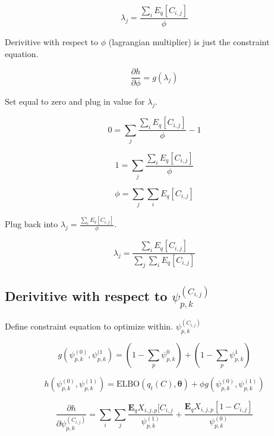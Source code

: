 \documentclass[12pt]{article}
\theoremstyle{definition}
\begin{document}
\begin{equation}
\lambda_{j} = \frac{\sum_{i}{E}_{q}[C_{i, j}]}{\phi}
\end{equation}

Derivitive with respect to $\phi$ (lagrangian multiplier) is just the constraint equation.

\begin{equation}
	\frac{\partial{h}}{\partial{\phi}} = g(\lambda_{j})
\end{equation}

Set equal to zero and plug in value for $\lambda_{j}$.

\begin{equation}
	0 = \sum_{j}  \frac{\sum_{i}{E}_{q}[C_{i, j}]}{\phi} - 1
\end{equation}

\begin{equation}
1 = \sum_{j}  \frac{\sum_{i}{E}_{q}[C_{i, j}]}{\phi}
\end{equation}

\begin{equation}
\phi = \sum_{j}  \sum_{i}{E}_{q}[C_{i, j}]
\end{equation}

Plug back into $\lambda_{j} = \frac{\sum_{i}{E}_{q}[C_{i, j}]}{\phi}$.

\begin{equation}
	\lambda_{j} = \frac{\sum_{i}{E}_{q}[C_{i, j}]}{\sum_{j}  \sum_{i}{E}_{q}[C_{i, j}]}
\end{equation}

\subsection{Derivitive with respect to $\psi_{p, k}^{(C_{i, j})}$}

Define constraint equation to optimize within. $\psi_{p, k}^{(C_{i, j})}$

\begin{equation}
	g(\psi_{p, k}^{(0)}, \psi_{p, k}^{(1}) = (1 - \sum_{p} \psi_{p, k}^0) + (1 - \sum_{p} \psi_{p, k}^1)
\end{equation}

\begin{equation}
h(\psi_{p, k}^{(0)}, \psi_{p, k}^{(1)}) = \textrm{ELBO}(q_{t}(C), \boldsymbol{\theta}) + \phi g(\psi_{p, k}^{(0)}, \psi_{p, k}^{(1)})
\end{equation}

\begin{equation}
\frac{\partial{h}}{\partial{\psi_{p, k}^{(C_{i, j})}}} = \sum_{i}\sum_{j} \frac{\boldsymbol{E}_{q}X_{i,j,p}[C_{i,j}}{\psi^{(1)}_{p, k}} + \frac{\boldsymbol{E}_{q}X_{i,j,p}[1 - C_{i,j}]}{\psi^{(0)}_{p, k}}
\end{equation}
\end{document}
